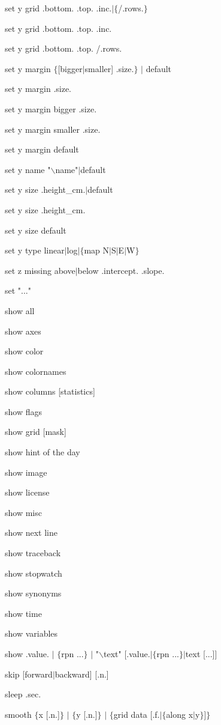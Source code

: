 
set y grid .bottom. .top. .inc.$\mid$$\lbrace$/.rows.$\rbrace$

set y grid .bottom. .top. .inc.

set y grid .bottom. .top. /.rows.

set y margin $\lbrace$[bigger$\mid$smaller] .size.$\rbrace$ $\mid$ default

set y margin .size.

set y margin bigger .size.

set y margin smaller .size.

set y margin default

set y name "$\backslash$name"$\mid$default

set y size .height\_cm.$\mid$default

set y size .height\_cm.

set y size default

set y type linear$\mid$log$\mid$$\lbrace$map N$\mid$S$\mid$E$\mid$W$\rbrace$

set z missing above$\mid$below .intercept. .slope.

set "..."

show all

show axes

show color

show colornames

show columns [statistics]

show flags

show grid [mask]

show hint of the day

show image

show license

show misc

show next line

show traceback

show stopwatch

show synonyms

show time

show variables

show .value. $\mid$ $\lbrace$rpn ...$\rbrace$ $\mid$ "$\backslash$text" [.value.$\mid$$\lbrace$rpn ...$\rbrace$$\mid$text [...]]

skip [forward$\mid$backward] [.n.]

sleep .sec.

smooth $\lbrace$x [.n.]$\rbrace$ $\mid$ $\lbrace$y [.n.]$\rbrace$ $\mid$ $\lbrace$grid data [.f.$\mid$$\lbrace$along x$\mid$y$\rbrace$]$\rbrace$

